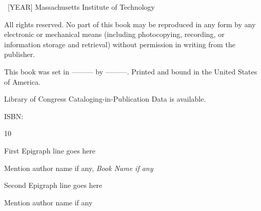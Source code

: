 \documentclass[7x10]{TimesAPriori_MIT}%
\begin{document}


\frontmatter



\halftitlepage







\begin{copyrightpage}
\textcopyright\ [YEAR] Massachusetts Institute of Technology

All rights reserved. No part of this book may be reproduced in any form by any electronic or mechanical means (including photocopying, recording, or information storage and retrieval) without permission in writing from the publisher.

This book was set in --------- by ---------. Printed and bound in the United States of America.

Library of Congress Cataloging-in-Publication Data is available.

ISBN:

10
\end{copyrightpage}

\dedication{Dedication text goes here} 

\begin{epigraphpage}
\epigraph{First Epigraph line goes here}{Mention author name if any,
\textit{Book Name if any}}

\epigraph{Second Epigraph line goes here}{Mention author name if any}
\end{epigraphpage}

\tableofcontents

\listoffigures
\end{document}
